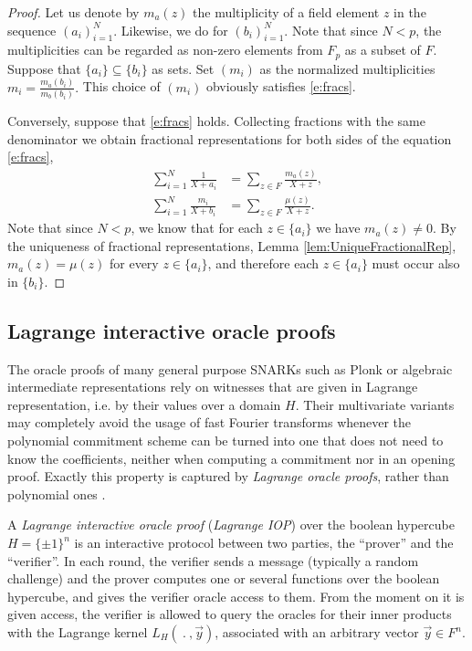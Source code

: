 \documentclass[11pt]{article}
\theoremstyle{definition}
\theoremstyle{remark}
\begin{document}
\begin{proof}%
Let us denote by $m_a(z)$ the multiplicity of a field element $z$ in the sequence $(a_i)_{i=1}^N$.
Likewise, we do for $(b_i)_{i=1}^N$.
Note that since $N < p$, the multiplicities can be regarded as non-zero elements from $F_p$ as a subset of $F$.
Suppose that $\{a_i\}\subseteq \{b_i\}$ as sets. 
Set $(m_i)$ as the normalized multiplicities
$
m_i = \frac{m_a(b_i)}{m_b(b_i)}.
$
This choice of $(m_i)$ obviously satisfies \eqref{e:fracs}.

Conversely, suppose that \eqref{e:fracs} holds.
Collecting fractions with the same denominator we obtain fractional representations for both sides of the equation \eqref{e:fracs},  
\begin{align*}
\sum_{i=1}^N \frac{1}{X + a_i} &= \sum_{z\in F} \frac{m_a(z)}{X + z},
\\
\sum_{i=1}^N \frac{m_i}{X + b_i} & = \sum_{z\in F} \frac{\mu (z)}{X + z}.
\end{align*}
Note that since $N < p$, we know that for each $z\in \{a_i\}$ we have $m_a(z)\neq 0$. 
By the uniqueness of fractional representations,  Lemma \ref{lem:UniqueFractionalRep}, $m_a(z) = \mu(z)$ for every $z\in \{a_i\}$, and therefore each $z\in \{a_i\}$ must occur also in $\{b_i\}$. 
\end{proof}



\subsection{Lagrange interactive oracle proofs}

The oracle proofs of many general purpose SNARKs such as Plonk \cite{Plonk} or algebraic intermediate representations \cite{Starks} rely on witnesses that are given in Lagrange representation, i.e. by their values over a domain $H$.
Their multivariate variants may completely avoid the usage of fast Fourier transforms whenever the polynomial commitment scheme can be turned into one that does not need to know the coefficients, neither when computing a commitment nor in an opening proof.
Exactly this property is captured by \textit{Lagrange oracle proofs}, rather than polynomial ones \cite{Dark}.

A \textit{Lagrange interactive oracle proof} (\textit{Lagrange IOP}) over the boolean hypercube $H=\{\pm 1\}^n$ is an interactive protocol between two parties, the ``prover'' and the ``verifier''.
In each round, the verifier sends a message (typically a random challenge) and the prover computes one or several functions over the boolean hypercube, and gives the verifier oracle access to them.
From the moment on it is given access, the verifier is allowed to query the oracles for their inner products with the Lagrange kernel $L_H(\:.\:, \vec y)$, associated with an arbitrary vector $\vec y\in F^n$. 
\end{document}
